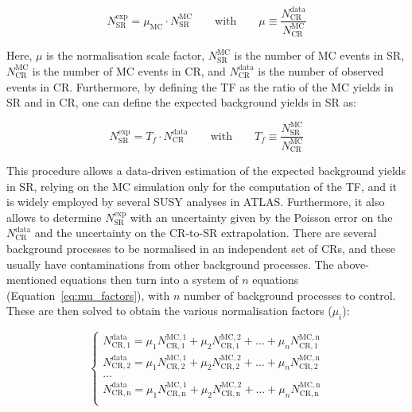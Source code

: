 		\begin{equation}
			N_{\mathrm{SR}}^{\mathrm{exp}} = \mu_{\mathrm{MC}} \cdot N_{\mathrm{SR}}^{\mathrm{MC}} \qquad \mathrm{with}\qquad \mu \equiv \frac{N_{\mathrm{CR}}^{\mathrm{data}}}{N_{\mathrm{CR}}^{\mathrm{MC}}} 
		\label{eq:exp_bkgyield}
		\end{equation}

		\noindent Here, $\mu$ is the normalisation scale factor, $N_{\mathrm{SR}}^{\mathrm{MC}}$ is the number of \ac{MC} events in \ac{SR}, $N_{\mathrm{CR}}^{\mathrm{MC}}$ is the number of \ac{MC} events in \ac{CR}, and $N_{\mathrm{CR}}^{\mathrm{data}}$ is the number of observed events in \ac{CR}. Furthermore, by defining the \ac{TF} as the ratio of the \ac{MC} yields in \ac{SR} and in \ac{CR}, one can define the expected background yields in \ac{SR} as: 
		
		\begin{equation}
			N_{\mathrm{SR}}^{\mathrm{exp}} = T_f \cdot N_{\mathrm{CR}}^{\mathrm{data}} \qquad \mathrm{with} \qquad T_f \equiv \frac{N_{\mathrm{SR}}^{\mathrm{MC}}}{N_{\mathrm{CR}}^{\mathrm{MC}}}
		\label{eq:tf}
		\end{equation}

		\noindent This procedure allows a data-driven estimation of the expected background yields in \ac{SR}, relying on the \ac{MC} simulation only for the computation of the \ac{TF}, and it is widely employed by several \ac{SUSY} analyses in \ac{ATLAS}. Furthermore, it also allows to determine $N_{\mathrm{SR}}^{\mathrm{exp}}$ with an uncertainty given by the Poisson error on the $N_{\mathrm{CR}}^{\mathrm{data}}$ and the uncertainty on the \ac{CR}-to-\ac{SR} extrapolation. There are several background processes to be normalised in an independent set of \acp{CR}, and these usually have contaminations from other background processes. The above-mentioned equations then turn into a system of $n$ equations (Equation~\ref{eq:mu_factors}), with $n$ number of background processes to control. These are then solved to obtain the various normalisation factors ($\mu_i$):

		\begin{equation}
			\begin{cases}
				N_{\mathrm{CR,1}}^{\mathrm{data}} = \mu_1 N_{\mathrm{CR,1}}^{\mathrm{MC,1}} + \mu_2 N_{\mathrm{CR,1}}^{\mathrm{MC,2}} + \dots + \mu_n N_{\mathrm{CR,1}}^{\mathrm{MC,n}} \\
				N_{\mathrm{CR,2}}^{\mathrm{data}} = \mu_1 N_{\mathrm{CR,2}}^{\mathrm{MC,1}} + \mu_2 N_{\mathrm{CR,2}}^{\mathrm{MC,2}} + \dots + \mu_n N_{\mathrm{CR,2}}^{\mathrm{MC,n}} \\
				\dots \\
				N_{\mathrm{CR,n}}^{\mathrm{data}} = \mu_1 N_{\mathrm{CR,n}}^{\mathrm{MC,1}} + \mu_2 N_{\mathrm{CR,n}}^{\mathrm{MC,2}} + \dots + \mu_n N_{\mathrm{CR,n}}^{\mathrm{MC,n}} \\
			\end{cases}
		\label{eq:mu_factors}
		\end{equation}

